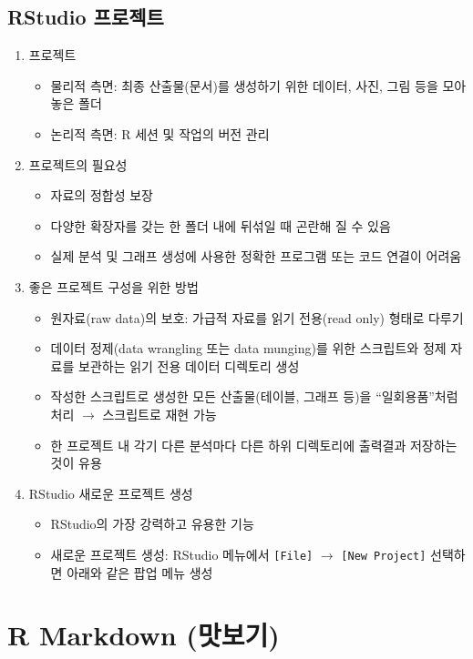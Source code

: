 \documentclass[
  11pt,
]{krantz}
\providecommand{\tightlist}{%
  \setlength{\itemsep}{0pt}\setlength{\parskip}{0pt}}
\begin{document}
\hypertarget{rstudio-project}{%
\subsection{RStudio 프로젝트}\label{rstudio-project}}

\begin{enumerate}
\def\labelenumi{\arabic{enumi}.}
\tightlist
\item
  프로젝트

  \begin{itemize}
  \tightlist
  \item
    물리적 측면: 최종 산출물(문서)를 생성하기 위한 데이터, 사진, 그림 등을 모아 놓은 폴더
  \item
    논리적 측면: R 세션 및 작업의 버전 관리
  \end{itemize}
\item
  프로젝트의 필요성

  \begin{itemize}
  \tightlist
  \item
    자료의 정합성 보장
  \item
    다양한 확장자를 갖는 한 폴더 내에 뒤섞일 때 곤란해 질 수 있음
  \item
    실제 분석 및 그래프 생성에 사용한 정확한 프로그램 또는 코드 연결이 어려움
  \end{itemize}
\item
  좋은 프로젝트 구성을 위한 방법

  \begin{itemize}
  \tightlist
  \item
    원자료(raw data)의 보호: 가급적 자료를 읽기 전용(read only) 형태로 다루기
  \item
    데이터 정제(data wrangling 또는 data munging)를 위한 스크립트와 정제 자료를 보관하는 읽기 전용 데이터 디렉토리 생성
  \item
    작성한 스크립트로 생성한 모든 산출물(테이블, 그래프 등)을 ``일회용품''처럼 처리 \(\rightarrow\) 스크립트로 재현 가능
  \item
    한 프로젝트 내 각기 다른 분석마다 다른 하위 디렉토리에 출력결과 저장하는 것이 유용
  \end{itemize}
\item
  RStudio 새로운 프로젝트 생성

  \begin{itemize}
  \tightlist
  \item
    RStudio의 가장 강력하고 유용한 기능
  \item
    새로운 프로젝트 생성: RStudio 메뉴에서 \texttt{{[}File{]}} \(\rightarrow\) \texttt{{[}New\ Project{]}} 선택하면 아래와 같은 팝업 메뉴 생성
  \end{itemize}
\end{enumerate}

\hypertarget{r-markdown-get-start}{%
\section{R Markdown (맛보기)}\label{r-markdown-get-start}}

  

\printindex
\end{document}
